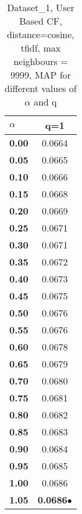 \begin{table}
\begin{center}
\begin{tabular}{ | l || c |}
\hline
\textbf{$\alpha$} & \textbf{q=1} \\
\hline
\textbf{0.00} & 0.0664\\
\hline
\textbf{0.05} & 0.0665\\
\hline
\textbf{0.10} & 0.0666\\
\hline
\textbf{0.15} & 0.0668\\
\hline
\textbf{0.20} & 0.0669\\
\hline
\textbf{0.25} & 0.0671\\
\hline
\textbf{0.30} & 0.0671\\
\hline
\textbf{0.35} & 0.0672\\
\hline
\textbf{0.40} & 0.0673\\
\hline
\textbf{0.45} & 0.0675\\
\hline
\textbf{0.50} & 0.0676\\
\hline
\textbf{0.55} & 0.0676\\
\hline
\textbf{0.60} & 0.0678\\
\hline
\textbf{0.65} & 0.0679\\
\hline
\textbf{0.70} & 0.0680\\
\hline
\textbf{0.75} & 0.0681\\
\hline
\textbf{0.80} & 0.0682\\
\hline
\textbf{0.85} & 0.0683\\
\hline
\textbf{0.90} & 0.0684\\
\hline
\textbf{0.95} & 0.0685\\
\hline
\textbf{1.00} & 0.0686\\
\hline
\textbf{1.05} & \textbf{0.0686}$\bullet$\\
\hline
\end{tabular}
\caption{Dataset\_1, User Based CF, distance=cosine, tfidf, max neighbours = 9999, MAP for different values of $\alpha$ and q}
\label{table:MAP_Dataset_1_ucf_cosine_tfidf_mnn=9999}
\end{center}
\end{table}

